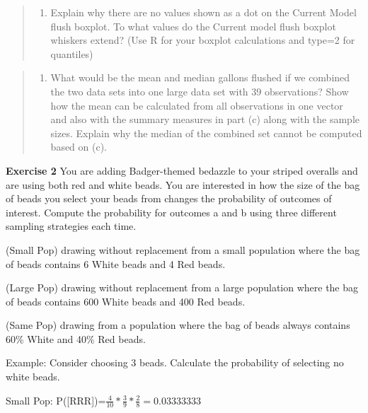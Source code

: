 \documentclass[
]{article}
\providecommand{\tightlist}{%
  \setlength{\itemsep}{0pt}\setlength{\parskip}{0pt}}
\begin{document}
\begin{quote}
\begin{enumerate}
\def\labelenumi{\alph{enumi}.}
\setcounter{enumi}{5}
\tightlist
\item
  Explain why there are no values shown as a dot on the Current Model
  flush boxplot. To what values do the Current model flush boxplot
  whiskers extend? (Use R for your boxplot calculations and type=2 for
  quantiles)
\end{enumerate}
\end{quote}

\vspace{.5cm}

\begin{quote}
\begin{enumerate}
\def\labelenumi{\alph{enumi}.}
\setcounter{enumi}{6}
\tightlist
\item
  What would be the mean and median gallons flushed if we combined the
  two data sets into one large data set with 39 observations? Show how
  the mean can be calculated from all observations in one vector and
  also with the summary measures in part (c) along with the sample
  sizes. Explain why the median of the combined set cannot be computed
  based on (c).
\end{enumerate}
\end{quote}

\vspace{.5cm}

\textbf{Exercise 2} You are adding Badger-themed bedazzle to your
striped overalls and are using both red and white beads. You are
interested in how the size of the bag of beads you select your beads
from changes the probability of outcomes of interest. Compute the
probability for outcomes a and b using three different sampling
strategies each time.

(Small Pop) drawing without replacement from a small population where
the bag of beads contains 6 White beads and 4 Red beads.

(Large Pop) drawing without replacement from a large population where
the bag of beads contains 600 White beads and 400 Red beads.

(Same Pop) drawing from a population where the bag of beads always
contains 60\% White and 40\% Red beads.

Example: Consider choosing 3 beads. Calculate the probability of
selecting no white beads.

Small Pop:
P({[}RRR{]})=\(\frac{4}{10}*\frac{3}{9}*\frac{2}{8}=0.03333333\)
\end{document}
